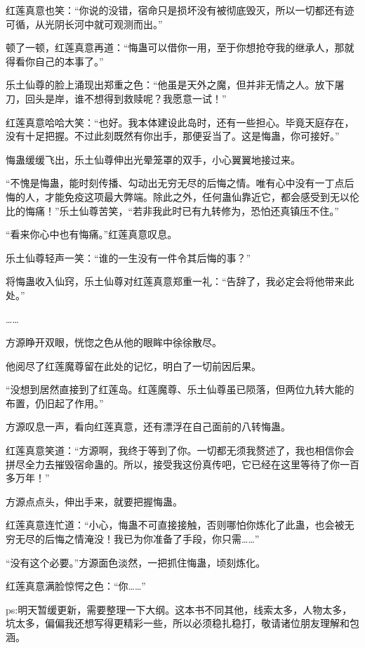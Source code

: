 \begin{this_body}
红莲真意也笑：“你说的没错，宿命只是损坏没有被彻底毁灭，所以一切都还有迹可循，从光阴长河中就可观测而出。”

顿了一顿，红莲真意再道：“悔蛊可以借你一用，至于你想抢夺我的继承人，那就得看你自己的本事了。”

乐土仙尊的脸上涌现出郑重之色：“他虽是天外之魔，但并非无情之人。放下屠刀，回头是岸，谁不想得到救赎呢？我愿意一试！”

红莲真意哈哈大笑：“也好。我本体建设此岛时，还有一些担心。毕竟天庭存在，没有十足把握。不过此刻既然有你出手，那便妥当了。这是悔蛊，你可接好。”

悔蛊缓缓飞出，乐土仙尊伸出光晕笼罩的双手，小心翼翼地接过来。

“不愧是悔蛊，能时刻传播、勾动出无穷无尽的后悔之情。唯有心中没有一丁点后悔的人，才能免疫这项最大弊端。除此之外，任何蛊仙靠近它，都会感受到无以伦比的悔痛！”乐土仙尊苦笑，“若非我此时已有九转修为，恐怕还真镇压不住。”

“看来你心中也有悔痛。”红莲真意叹息。

乐土仙尊轻声一笑：“谁的一生没有一件令其后悔的事？”

将悔蛊收入仙窍，乐土仙尊对红莲真意郑重一礼：“告辞了，我必定会将他带来此处。”

……

方源睁开双眼，恍惚之色从他的眼眸中徐徐散尽。

他阅尽了红莲魔尊留在此处的记忆，明白了一切前因后果。

“没想到居然直接到了红莲岛。红莲魔尊、乐土仙尊虽已陨落，但两位九转大能的布置，仍旧起了作用。”

方源叹息一声，看向红莲真意，还有漂浮在自己面前的八转悔蛊。

红莲真意笑道：“方源啊，我终于等到了你。一切都无须我赘述了，我也相信你会拼尽全力去摧毁宿命蛊的。所以，接受我这份真传吧，它已经在这里等待了你一百多万年！”

方源点点头，伸出手来，就要把握悔蛊。

红莲真意连忙道：“小心，悔蛊不可直接接触，否则哪怕你炼化了此蛊，也会被无穷无尽的后悔之情淹没！我已为你准备了手段，你只需……”

“没有这个必要。”方源面色淡然，一把抓住悔蛊，顷刻炼化。

红莲真意满脸惊愕之色：“你……”

ps:明天暂缓更新，需要整理一下大纲。这本书不同其他，线索太多，人物太多，坑太多，偏偏我还想写得更精彩一些，所以必须稳扎稳打，敬请诸位朋友理解和包涵。

\end{this_body}

